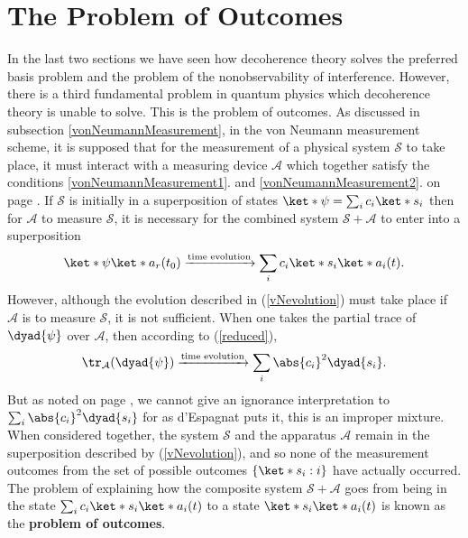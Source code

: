 \documentclass[12pt]{report}
\begin{document}
    
   

  
    \section{The Problem of Outcomes}\label{probOutcomes}
    In the last two sections we have seen how decoherence theory solves the preferred basis problem and the problem of the nonobservability of interference. However, there is a third fundamental problem in quantum physics which decoherence theory is unable to solve. This is the problem of outcomes. As discussed in subsection \ref{vonNeumannMeasurement}, in the von Neumann measurement scheme, it is supposed that for the measurement of a physical system $\mathcal{S}$ to take place, it must interact with a measuring device $\mathcal{A}$ which together satisfy the conditions \ref{vonNeumannMeasurement1}. and \ref{vonNeumannMeasurement2}. on page \pageref{vonNeumannMeasurement1}. If $\mathcal{S}$ is initially in a superposition of states $\ket*{\psi}=\sum_i c_i\ket*{s_i}$ then for $\mathcal{A}$ to measure $\mathcal{S}$, it is necessary for the combined system $\mathcal{S}+\mathcal{A}$ to enter into a superposition
    \begin{equation}\label{vNevolution}
    \ket*{\psi}\ket*{a_r(t_0)}\xrightarrow{\text{time evolution}}\sum_i c_i\ket*{s_i}\ket*{a_i(t)}.
    \end{equation}
    However, although the evolution described in (\ref{vNevolution}) must take place if $\mathcal{A}$ is to measure $\mathcal{S}$, it is not sufficient. When one takes the partial trace of $\dyad{\psi}$ over $\mathcal{A}$, then according to (\ref{reduced}),
    \begin{equation}\label{vNevolution2}
    \tr_\mathcal{A}(\dyad{\psi})\xrightarrow{\text{time evolution}}\sum_i \abs{c_i}^2\dyad{s_i}.
    \end{equation} 
    But as noted on page \pageref{Espagnat}, we cannot give an ignorance interpretation to $\sum_i \abs{c_i}^2\dyad{s_i}$ for as d'Espagnat puts it, this is an improper mixture. When considered together, the system $\mathcal{S}$ and the apparatus $\mathcal{A}$ remain in the superposition described by (\ref{vNevolution}), and so none of the measurement outcomes from the set of possible outcomes $\{\ket*{s_i}:i\}$ have actually occurred. The problem of explaining how the composite system   $\mathcal{S}+\mathcal{A}$       goes from being in the state $\sum_i c_i\ket*{s_i}\ket*{a_i(t)}$ to a state $\ket*{s_i}\ket*{a_i(t)}$ is known as the \textbf{problem of outcomes}.\label{proboutcomes}  
\end{document}
